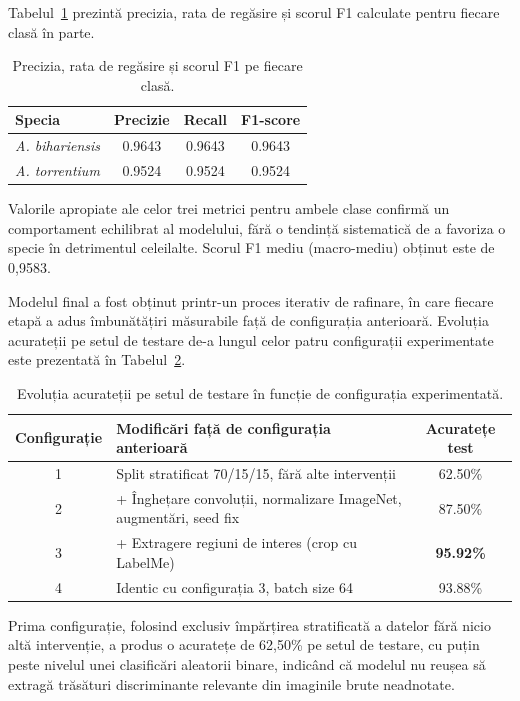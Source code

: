Tabelul~\ref{tab:metrici} prezintă precizia, rata de regăsire și scorul F1 calculate pentru fiecare clasă în parte.

\begin{table}[H]
\centering
\caption{Precizia, rata de regăsire și scorul F1 pe fiecare clasă.}
\label{tab:metrici}
\begin{tabular}{lccc}
\hline
\textbf{Specia} & \textbf{Precizie} & \textbf{Recall} & \textbf{F1-score} \\
\hline
\textit{A. bihariensis} & 0.9643 & 0.9643 & 0.9643 \\
\textit{A. torrentium}  & 0.9524 & 0.9524 & 0.9524 \\
\hline
\end{tabular}
\end{table}

Valorile apropiate ale celor trei metrici pentru ambele clase confirmă un comportament echilibrat al modelului, fără o tendință sistematică de a favoriza o specie în detrimentul celeilalte. Scorul F1 mediu (macro-mediu) obținut este de 0,9583.

Modelul final a fost obținut printr-un proces iterativ de rafinare, în care fiecare etapă a adus îmbunătățiri măsurabile față de configurația anterioară. Evoluția acurateții pe setul de testare de-a lungul celor patru configurații experimentate este prezentată în Tabelul~\ref{tab:evolutie_runs}.

\begin{table}[H]
\centering
\caption{Evoluția acurateții pe setul de testare în funcție de
configurația experimentată.}
\label{tab:evolutie_runs}
\begin{tabular}{cp{9cm}c}
\hline
\textbf{Configurație} & \textbf{Modificări față de configurația anterioară}
& \textbf{Acuratețe test} \\
\hline
1 & Split stratificat 70/15/15, fără alte intervenții & 62.50\% \\
2 & + Înghețare convoluții, normalizare ImageNet, augmentări, seed fix & 87.50\% \\
3 & + Extragere regiuni de interes (crop cu LabelMe) & \textbf{95.92\%} \\
4 & Identic cu configurația 3, batch size 64 & 93.88\% \\
\hline
\end{tabular}
\end{table}

Prima configurație, folosind exclusiv împărțirea stratificată a datelor fără nicio altă intervenție, a produs o acuratețe de 62,50\% pe setul de testare, cu puțin peste nivelul unei clasificări aleatorii binare, indicând că modelul nu reușea să extragă trăsături discriminante relevante din imaginile brute neadnotate.


